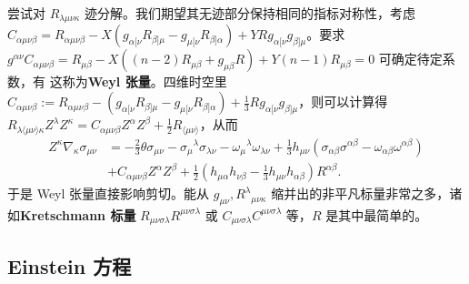 尝试对 $R_{\lambda\mu\nu\kappa}$ 迹分解。我们期望其无迹部分保持相同的指标对称性，考虑 $C_{\alpha\mu\nu\beta} = R_{\alpha\mu\nu\beta} - X(g_{\alpha[\nu} R_{\beta]\mu} - g_{\mu[\nu} R_{\beta]\alpha}) + Y R g_{\alpha[\nu} g_{\beta]\mu}$。要求 $g^{\alpha\nu}C_{\alpha\mu\nu\beta} = R_{\mu\beta} - X((n-2)R_{\mu\beta}+g_{\mu\beta} R) + Y(n-1)R_{\mu\beta} = 0$ 可确定待定系数，有
这称为\textbf{Weyl 张量}。四维时空里 $C_{\alpha\mu\nu\beta} := R_{\alpha\mu\nu\beta} - (g_{\alpha[\nu} R_{\beta]\mu} - g_{\mu[\nu} R_{\beta]\alpha}) + \frac13 R g_{\alpha[\nu} g_{\beta]\mu}$，则可以计算得 $R_{\lambda\langle\mu\nu\rangle\kappa} Z^\lambda Z^\kappa = C_{\alpha\mu\nu\beta} Z^\alpha Z^\beta + \frac12 R_{\langle \mu\nu \rangle}$，从而
\begin{align}
    Z^\kappa \nabla_\kappa \sigma_{\mu\nu} &= -\frac23 \theta\sigma_{\mu\nu}
  - \sigma_\mu{}^{\lambda}\sigma_{\lambda\nu} - \omega_\mu{}^{\lambda}\omega_{\lambda\nu}
  + \frac13 h_{\mu\nu} \left(\sigma_{\alpha\beta}\sigma^{\alpha\beta}
  - \omega_{\alpha\beta}\omega^{\alpha\beta}\right)\nonumber \\
  & + C_{\alpha\mu\nu\beta} Z^\alpha Z^\beta + \frac12 \left(
h_{\mu\alpha} h_{\nu\beta}
-\frac{1}{3} h_{\mu\nu} h_{\alpha\beta}
\right)R^{\alpha\beta}.
\end{align}
于是 Weyl 张量直接影响剪切。能从 $g_{\mu\nu},R^\lambda{}_{\mu\nu\kappa}$ 缩并出的非平凡标量非常之多，诸如\textbf{Kretschmann 标量} $R_{\mu\nu\sigma\lambda}R^{\mu\nu\sigma\lambda}$ 或 $C_{\mu\nu\sigma\lambda}C^{\mu\nu\sigma\lambda}$ 等，$R$ 是其中最简单的。

\subsection{Einstein 方程}

